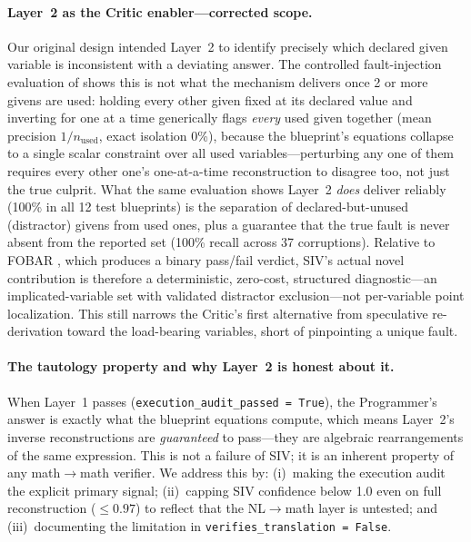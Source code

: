 \documentclass[11pt,a4paper]{article}
\begin{document}
\paragraph{Layer~2 as the Critic enabler---corrected scope.}
Our original design intended Layer~2 to identify precisely which declared given variable is inconsistent with a deviating answer.
The controlled fault-injection evaluation of  shows this is not what the mechanism delivers once 2 or more givens are used: holding every other given fixed at its declared value and inverting for one at a time generically flags \emph{every} used given together (mean precision $1/n_{\text{used}}$, exact isolation 0\%), because the blueprint's equations collapse to a single scalar constraint over all used variables---perturbing any one of them requires every other one's one-at-a-time reconstruction to disagree too, not just the true culprit.
What the same evaluation shows Layer~2 \emph{does} deliver reliably (100\% in all 12 test blueprints) is the separation of declared-but-unused (distractor) givens from used ones, plus a guarantee that the true fault is never absent from the reported set (100\% recall across 37 corruptions).
Relative to FOBAR \citep{jiang2024fobar}, which produces a binary pass/fail verdict, SIV's actual novel contribution is therefore a deterministic, zero-cost, structured diagnostic---an implicated-variable set with validated distractor exclusion---not per-variable point localization.
This still narrows the Critic's first alternative from speculative re-derivation toward the load-bearing variables, short of pinpointing a unique fault.

\paragraph{The tautology property and why Layer~2 is honest about it.}
When Layer~1 passes (\texttt{execution\_audit\_passed = True}), the Programmer's answer is exactly what the blueprint equations compute, which means Layer~2's inverse reconstructions are \emph{guaranteed} to pass---they are algebraic rearrangements of the same expression.
This is not a failure of SIV; it is an inherent property of any math$\to$math verifier.
We address this by: (i)~making the execution audit the explicit primary signal; (ii)~capping SIV confidence below 1.0 even on full reconstruction ($\leq 0.97$) to reflect that the NL$\to$math layer is untested; and (iii)~documenting the limitation in \texttt{verifies\_translation = False}.
\end{document}
